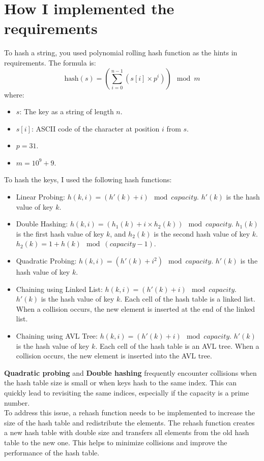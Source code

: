 \section{How I implemented the requirements}

To hash a string, you used polynomial rolling hash function as the hints in requirements. The formula is:
\begin{equation}
	\text{hash}(s) = \left( \sum_{i = 0}^{n - 1} (s[i] \times p^i) \right) \mod m
\end{equation}
where:
\begin{itemize}
	\item $s$: The key as a string of length $n$.
	\item $s[i]$: ASCII code of the character at position $i$ from $s$.
	\item $p = 31$.
	\item $m = 10^9 + 9$.
\end{itemize}
To hash the keys, I used the following hash functions:
\begin{itemize}
	\item Linear Probing: $h(k, i) = (h'(k) + i) \mod capacity$. $h'(k)$ is the hash value of key $k$.
	\item Double Hashing: $h(k, i) = (h_1(k) + i \times h_2(k)) \mod capacity$. $h_1(k)$ is the first hash value of key $k$, and $h_2(k)$ is the second hash value of key $k$. $h_2(k) = 1 + h(k) \mod (capacity -1) $.
	\item Quadratic Probing: $h(k, i) = (h'(k) + i^2) \mod capacity$.  $h'(k)$ is the hash value of key $k$.
	\item Chaining using Linked List: $h(k, i) = (h'(k) + i) \mod capacity$. $h'(k)$ is the hash value of key $k$.  Each cell of the hash table is a linked list. When a collision occurs, the new element is inserted at the end of the linked list.
	\item Chaining using AVL Tree: $h(k, i) = (h'(k) + i) \mod capacity$. $h'(k)$ is the hash value of key $k$. Each cell of the hash table is an AVL tree. When a collision occurs, the new element is inserted into the AVL tree.
\end{itemize}

\textbf{Quadratic probing} and \textbf{Double hashing} frequently encounter collisions when the hash table size is small or when keys hash to the same index. This can quickly lead to revisiting the same indices, especially if the capacity is a prime number.\\

To address this issue, a rehash function needs to be implemented to increase the size of the hash table and redistribute the elements. The rehash function creates a new hash table with double size and transfers all elements from the old hash table to the new one. This helps to minimize collisions and improve the performance of the hash table.



